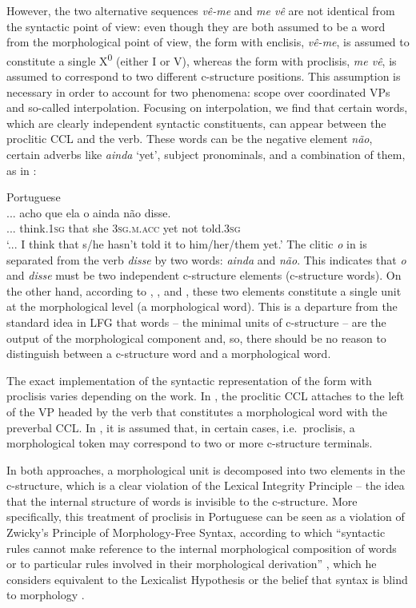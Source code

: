 \documentclass[output=paper,hidelinks]{langscibook}
\begin{document}
However, the two alternative sequences \textit{vê-me} and \textit{me vê} are not identical from the syntactic point of view: even though they are both assumed to be a word from the morphological point of view, the form with enclisis, \textit{vê-me}, is assumed to constitute a single X\textsuperscript{0} (either I or V), whereas the form with proclisis, \textit{me vê}, is assumed to correspond to two different c-structure positions. This assumption is necessary in order to account for two phenomena: scope over coordinated VPs and so-called interpolation. Focusing on interpolation, we find that certain words, which are clearly independent syntactic constituents, can appear between the proclitic CCL and the verb. These words can be the negative element \textit{não}, certain adverbs like \textit{ainda} `yet', subject pronominals, and a combination of them, as in :

\ea\label{ex:Romance:9}  Portuguese \citep{LuisOtoguro2005}\\
\gll
... acho que ela o ainda não disse.\\
... think.\textsc{1sg} that she 3\textsc{sg.m.acc} yet not told.3\textsc{sg}\\
\glt `... I think that s/he hasn't told it to him/her/them yet.'
\z
The clitic \textit{o} in  is separated from the verb \textit{disse} by two words: \textit{ainda} and \textit{não}. This indicates that \textit{o} and \textit{disse} must be two independent c-structure elements (c-structure words). On the other hand, according to \citet{LuisSadler2003}, \citet{LuisOtoguro2004,LuisOtoguro2005}, and \citet{LuisSpencer2005}, these two elements constitute a single unit at the morphological level (a morphological word). This is a departure from the standard idea in LFG that words -- the minimal units of c-structure -- are the output of the morphological component and, so, there should be no reason to distinguish between a c-structure word and a morphological word. 

The exact implementation of the syntactic representation of the form with proclisis varies depending on the work. In \citet{LuisSadler2003}, the proclitic CCL attaches to the left of the VP headed by the verb that constitutes a morphological word with the preverbal CCL. In \citet{LuisOtoguro2004}, it is assumed that, in certain cases, i.e.\ proclisis, a morphological token may correspond to two or more c-structure terminals.

In both approaches, a morphological unit is decomposed into two elements in the c-structure, which is a clear violation of the Lexical Integrity Principle -- the idea that the internal structure of words is invisible to the c-structure. More specifically, this treatment of proclisis in Portuguese can be seen as a violation of Zwicky's Principle of Morphology-Free Syntax, according to which ``syntactic rules cannot make reference to the internal morphological composition of words or to particular rules involved in their morphological derivation'' \citep[650]{Zwicky1987}, which he considers equivalent to the Lexicalist Hypothesis or the belief that syntax is blind to morphology \citep[244]{ONeill2016}.
\end{document}
